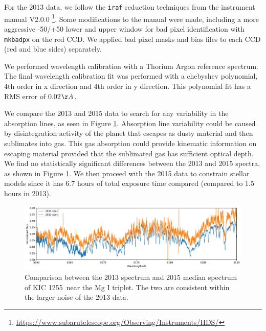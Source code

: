 \documentclass[preprint]{aastex61}
\newcommand{\shStar}{KIC 1255}
\begin{document}
For the 2013 data, we follow the \texttt{iraf} reduction techniques from the instrument manual V2.0.0  \footnote{\url{https://www.subarutelescope.org/Observing/Instruments/HDS/}}.
Some modifications to the manual were made, including a more aggressive -50/+50 lower and upper window for bad pixel identification with \texttt{mkbadpx} on the red CCD.
We applied bad pixel masks and bias files to each CCD (red and blue sides) separately.

We performed wavelength calibration with a Thorium Argon reference spectrum.
The final wavelength calibration fit was performed with a chebyshev polynomial, 4th order in x direction and 4th order in y direction.
This polynomial fit has a RMS error of 0.02$\AA$.

We compare the 2013 and 2015 data to search for any variability in the absorption lines, as seen in Figure \ref{fig:spec2013vs2015}.
Absorption line variability could be caused by disintegration activity of the planet that escapes as dusty material and then sublimates into gas.
This gas absorption could provide kinematic information on escaping material provided that the sublimated gas has sufficient optical depth.
We find no statistically significant differences between the 2013 and 2015 spectra, as shown in Figure \ref{fig:spec2013vs2015}.
We then proceed with the 2015 data to constrain stellar models since it has 6.7 hours of total exposure time compared (compared to 1.5 hours in 2013).

\begin{figure}[!hbtp]
\begin{centering}
\includegraphics[width=1.0\textwidth]{images/subaru/2013_vs_2015/2013_vs_2015_spec.pdf}
\caption{Comparison between the 2013 spectrum and 2015 median spectrum of \shStar\ near the Mg I triplet. The two are consistent within the larger noise of the 2013 data.}\label{fig:spec2013vs2015}
\end{centering}
\end{figure}
\end{document}
